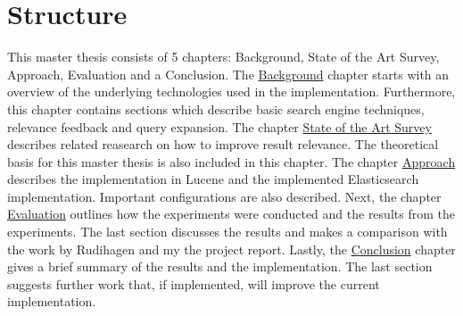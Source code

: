 \section{Structure}
This master thesis consists of 5 chapters: Background, State of the Art Survey, Approach, Evaluation and a Conclusion.
The \hyperref[ch:background]{Background} chapter starts with an overview of the underlying technologies used in the implementation.
Furthermore, this chapter contains sections which describe basic search engine techniques, relevance feedback and query expansion.
The chapter \hyperref[ch:related-work]{State of the Art Survey} describes related reasearch on how to improve result relevance.
The theoretical basis for this master thesis is also included in this chapter.
The chapter \hyperref[ch:approach]{Approach} describes the implementation in Lucene and the implemented Elasticsearch implementation.
Important configurations are also described.
Next, the chapter \hyperref[ch:evaluation]{Evaluation} outlines how the experiments were conducted and the results from the experiments.
The last section discusses the results and makes a comparison with the work by Rudihagen and my the project report.
Lastly, the \hyperref[ch:conclusion]{Conclusion} chapter gives a brief summary of the results and the implementation.
The last section suggests further work that, if implemented, will improve the current implementation.
